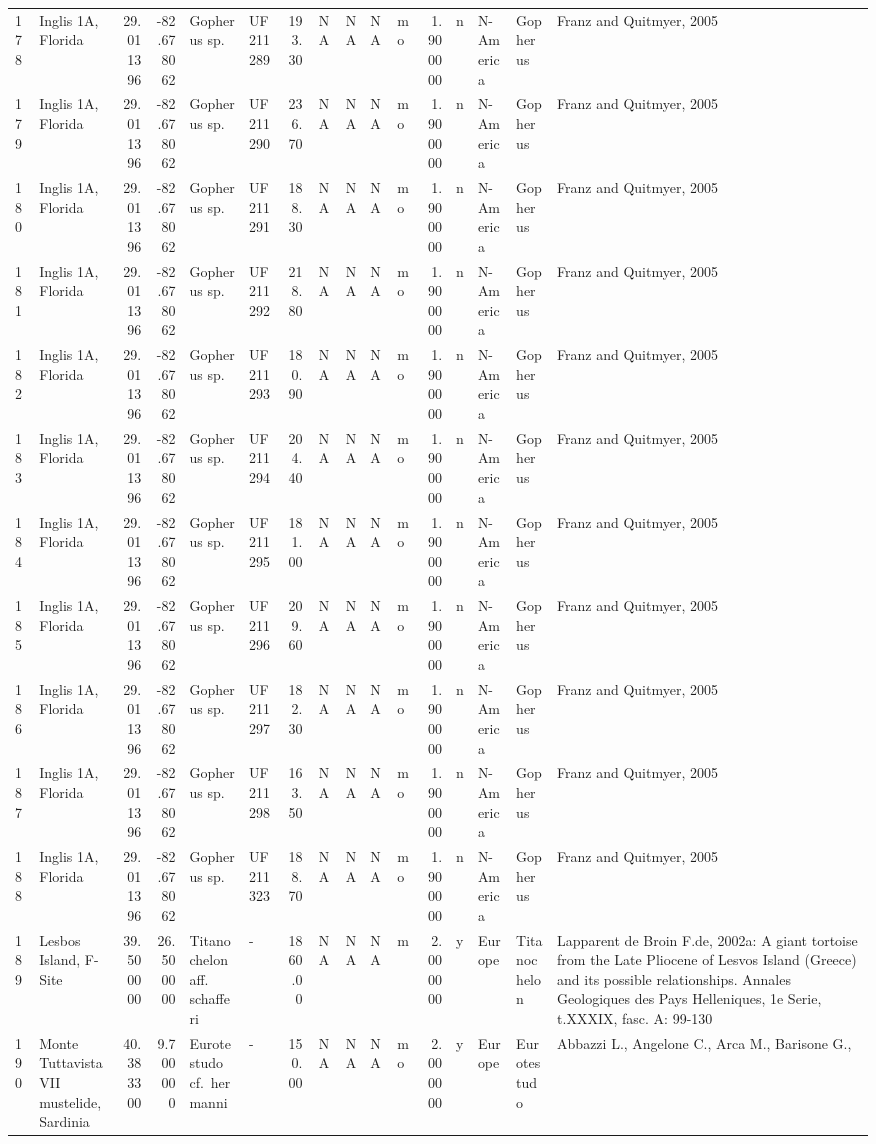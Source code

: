 \documentclass[]{article}
\begin{document}
\begin{longtable}[]{@{}llrrllrrrllrllll@{}}
178 & Inglis 1A, Florida & 29.011396 & -82.678062 & Gopherus sp. & UF
211289 & 193.30 & NA & NA & NA & mo & 1.900000 & n & N-America &
Gopherus & Franz and Quitmyer, 2005\tabularnewline
179 & Inglis 1A, Florida & 29.011396 & -82.678062 & Gopherus sp. & UF
211290 & 236.70 & NA & NA & NA & mo & 1.900000 & n & N-America &
Gopherus & Franz and Quitmyer, 2005\tabularnewline
180 & Inglis 1A, Florida & 29.011396 & -82.678062 & Gopherus sp. & UF
211291 & 188.30 & NA & NA & NA & mo & 1.900000 & n & N-America &
Gopherus & Franz and Quitmyer, 2005\tabularnewline
181 & Inglis 1A, Florida & 29.011396 & -82.678062 & Gopherus sp. & UF
211292 & 218.80 & NA & NA & NA & mo & 1.900000 & n & N-America &
Gopherus & Franz and Quitmyer, 2005\tabularnewline
182 & Inglis 1A, Florida & 29.011396 & -82.678062 & Gopherus sp. & UF
211293 & 180.90 & NA & NA & NA & mo & 1.900000 & n & N-America &
Gopherus & Franz and Quitmyer, 2005\tabularnewline
183 & Inglis 1A, Florida & 29.011396 & -82.678062 & Gopherus sp. & UF
211294 & 204.40 & NA & NA & NA & mo & 1.900000 & n & N-America &
Gopherus & Franz and Quitmyer, 2005\tabularnewline
184 & Inglis 1A, Florida & 29.011396 & -82.678062 & Gopherus sp. & UF
211295 & 181.00 & NA & NA & NA & mo & 1.900000 & n & N-America &
Gopherus & Franz and Quitmyer, 2005\tabularnewline
185 & Inglis 1A, Florida & 29.011396 & -82.678062 & Gopherus sp. & UF
211296 & 209.60 & NA & NA & NA & mo & 1.900000 & n & N-America &
Gopherus & Franz and Quitmyer, 2005\tabularnewline
186 & Inglis 1A, Florida & 29.011396 & -82.678062 & Gopherus sp. & UF
211297 & 182.30 & NA & NA & NA & mo & 1.900000 & n & N-America &
Gopherus & Franz and Quitmyer, 2005\tabularnewline
187 & Inglis 1A, Florida & 29.011396 & -82.678062 & Gopherus sp. & UF
211298 & 163.50 & NA & NA & NA & mo & 1.900000 & n & N-America &
Gopherus & Franz and Quitmyer, 2005\tabularnewline
188 & Inglis 1A, Florida & 29.011396 & -82.678062 & Gopherus sp. & UF
211323 & 188.70 & NA & NA & NA & mo & 1.900000 & n & N-America &
Gopherus & Franz and Quitmyer, 2005\tabularnewline
189 & Lesbos Island, F-Site & 39.500000 & 26.500000 & Titanochelon aff.
schafferi & - & 1860.00 & NA & NA & NA & m & 2.000000 & y & Europe &
Titanochelon & Lapparent de Broin F.de, 2002a: A giant tortoise from the
Late Pliocene of Lesvos Island (Greece) and its possible relationships.
Annales Geologiques des Pays Helleniques, 1e Serie, t.XXXIX, fasc. A:
99-130\tabularnewline
190 & Monte Tuttavista VII mustelide, Sardinia & 40.383300 & 9.700000 &
Eurotestudo cf.~hermanni & - & 150.00 & NA & NA & NA & mo & 2.000000 & y
& Europe & Eurotestudo & Abbazzi L., Angelone C., Arca M., Barisone G.,

\end{longtable}
\end{document}
